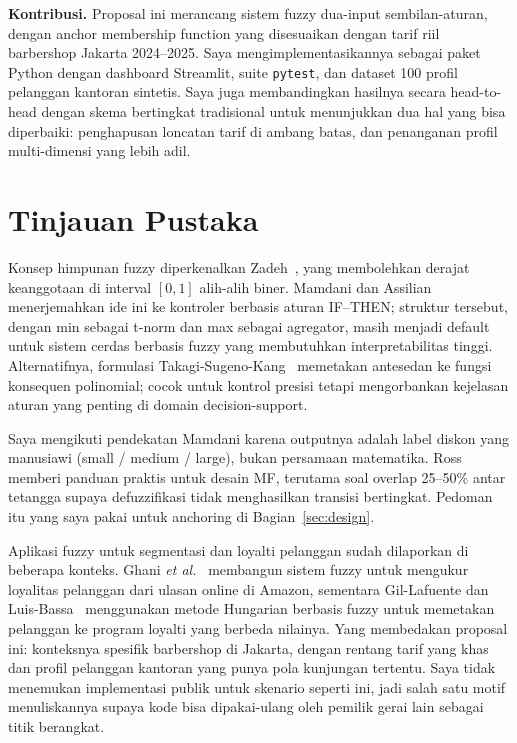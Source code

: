 \documentclass[conference]{IEEEtran}
\begin{document}
\textbf{Kontribusi.} Proposal ini merancang sistem fuzzy dua-input
sembilan-aturan, dengan anchor membership function yang disesuaikan
dengan tarif riil barbershop Jakarta 2024--2025. Saya
mengimplementasikannya sebagai paket Python dengan dashboard Streamlit,
suite \texttt{pytest}, dan dataset 100 profil pelanggan kantoran sintetis.
Saya juga membandingkan hasilnya secara head-to-head dengan skema
bertingkat tradisional untuk menunjukkan dua hal yang bisa diperbaiki:
penghapusan loncatan tarif di ambang batas, dan penanganan profil
multi-dimensi yang lebih adil.

\section{Tinjauan Pustaka}

Konsep himpunan fuzzy diperkenalkan Zadeh~\cite{zadeh1965}, yang membolehkan
derajat keanggotaan di interval $[0, 1]$ alih-alih biner. Mamdani dan
Assilian~\cite{mamdani1975} menerjemahkan ide ini ke kontroler berbasis
aturan IF--THEN; struktur tersebut, dengan min sebagai t-norm dan max
sebagai agregator, masih menjadi default untuk sistem cerdas berbasis
fuzzy yang membutuhkan interpretabilitas tinggi. Alternatifnya, formulasi
Takagi-Sugeno-Kang~\cite{takagi1985} memetakan antesedan ke fungsi konsequen
polinomial; cocok untuk kontrol presisi tetapi mengorbankan kejelasan
aturan yang penting di domain decision-support.

Saya mengikuti pendekatan Mamdani karena outputnya adalah label diskon yang
manusiawi (small / medium / large), bukan persamaan matematika.
Ross~\cite{ross2010} memberi panduan praktis untuk desain MF, terutama
soal overlap 25--50\% antar tetangga supaya defuzzifikasi tidak
menghasilkan transisi bertingkat. Pedoman itu yang saya pakai untuk
anchoring di Bagian~\ref{sec:design}.

Aplikasi fuzzy untuk segmentasi dan loyalti pelanggan sudah dilaporkan di
beberapa konteks. Ghani \emph{et al.}~\cite{ghani2018} membangun sistem
fuzzy untuk mengukur loyalitas pelanggan dari ulasan online di Amazon,
sementara Gil-Lafuente dan Luis-Bassa~\cite{gillafuente2012} menggunakan
metode Hungarian berbasis fuzzy untuk memetakan pelanggan ke program
loyalti yang berbeda nilainya. Yang membedakan proposal ini: konteksnya
spesifik barbershop di Jakarta, dengan rentang tarif yang khas dan profil
pelanggan kantoran yang punya pola kunjungan tertentu. Saya tidak
menemukan implementasi publik untuk skenario seperti ini, jadi salah satu
motif menuliskannya supaya kode bisa dipakai-ulang oleh pemilik gerai
lain sebagai titik berangkat.
\end{document}
